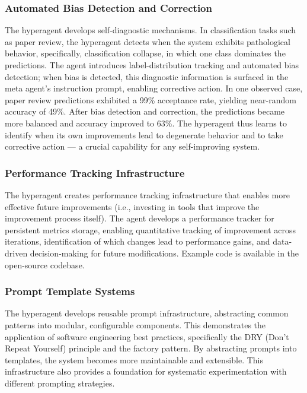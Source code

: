 \subsubsection{Automated Bias Detection and Correction}

The hyperagent develops self-diagnostic mechanisms. In classification tasks such as paper review, the hyperagent detects when the system exhibits pathological behavior, specifically, classification collapse, in which one class dominates the predictions. The agent introduces label-distribution tracking and automated bias detection; when bias is detected, this diagnostic information is surfaced in the meta agent's instruction prompt, enabling corrective action. In one observed case, paper review predictions exhibited a 99\% acceptance rate, yielding near-random accuracy of 49\%. After bias detection and correction, the predictions became more balanced and accuracy improved to 63\%. The hyperagent thus learns to identify when its own improvements lead to degenerate behavior and to take corrective action --- a crucial capability for any self-improving system.

\subsubsection{Performance Tracking Infrastructure}

The hyperagent creates performance tracking infrastructure that enables more effective future improvements (i.e., investing in tools that improve the improvement process itself). The agent develops a performance tracker for persistent metrics storage, enabling quantitative tracking of improvement across iterations, identification of which changes lead to performance gains, and data-driven decision-making for future modifications. Example code is available in the open-source codebase.

\subsubsection{Prompt Template Systems}

The hyperagent develops reusable prompt infrastructure, abstracting common patterns into modular, configurable components. This demonstrates the application of software engineering best practices, specifically the DRY (Don't Repeat Yourself) principle and the factory pattern. By abstracting prompts into templates, the system becomes more maintainable and extensible. This infrastructure also provides a foundation for systematic experimentation with different prompting strategies.

